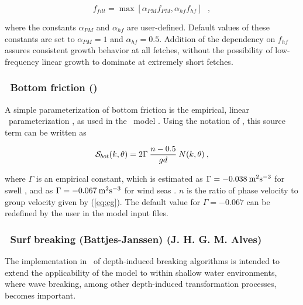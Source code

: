 \begin{equation}
f_{filt} = \max \left [ \alpha_{PM} f_{PM} , \alpha_{hf} f_{hf} \right ]
\:\:\: ,
\end{equation}

\noindent
where the constants $\alpha_{PM}$ and $\alpha_{hf}$ are user-defined. Default
values of these constants are set to $\alpha_{PM} = 1$ and $\alpha_{hf} =
0.5$.  Addition of the dependency on $f_{hf}$ assures consistent growth
behavior at all fetches, without the possibility of low-frequency linear
growth to dominate at extremely short fetches.


\vsssub
\subsubsection{~Bottom friction (\js)} \label{sec:jonswap}
\vsssub

A simple parameterization of bottom friction is the empirical, linear \js\
parameterization \citep{art:JONSWAP}, as used in the \wam\ model
\citep{art:WAM88}. Using the notation of \cite{tol:JPO91b}, this source term
can be written as


\begin{equation}
{\cal S}_{bot}(k,\theta) = 2 \Gamma \: \frac{n-0.5}{gd} \: N(k,\theta)
\: , \label{eq:JONSWAP_bot}
\end{equation}

\noindent
where $\Gamma$ is an empirical constant, which is estimated as $\Gamma =
-0.038\:\mbox m^2 \mbox s ^{-3}$ for swell \citep{art:JONSWAP}, and as $\Gamma
= -0.067\:\mbox m^2 \mbox s^{-3}$ for wind seas \citep{art:BK83}. $n$ is the
ratio of phase velocity to group velocity given by (\ref{eq:cg}). The default
value for $\Gamma = -0.067$ can be redefined by the user in the model input
files.


\vsssub
\subsubsection{~Surf breaking (Battjes-Janssen) \hfill {\rm (J. H. G. M. Alves)}} \label{sec:BJ}
\vsssub

The implementation in \ws\ of depth-induced breaking algorithms is intended to
extend the applicability of the model to within shallow water environments,
where wave breaking, among other depth-induced transformation processes,
becomes important.

